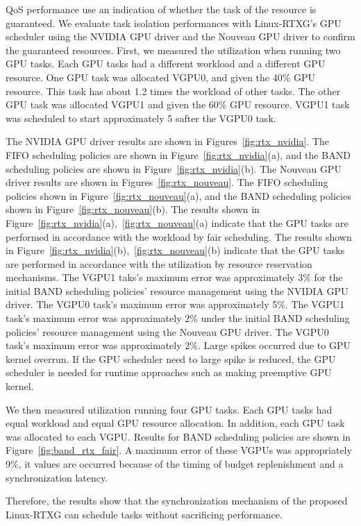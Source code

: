 QoS performance use an indication of whether the task of the resource is guaranteed.
We evaluate task isolation performances with Linux-RTXG’s GPU scheduler using the NVIDIA GPU driver and the Nouveau GPU driver to confirm the guaranteed resources.
First, we measured the utilization when running two GPU tasks.
Each GPU tasks had a different workload and a different GPU resource.
One GPU task was allocated VGPU0, and given the 40\% GPU resource.
This task has about 1.2 times the workload of other tasks.
The other GPU task was allocated VGPU1 and given the 60\% GPU resource.
VGPU1 task was scheduled to start approximately 5 safter the VGPU0 task.

The NVIDIA GPU driver results are shown in Figures~\ref{fig:rtx_nvidia}.
The FIFO scheduling policies are shown in Figure~\ref{fig:rtx_nvidia}(a),
and the BAND scheduling policies are shown in Figure~\ref{fig:rtx_nvidia}(b).
The Nouveau GPU driver results are shown in Figures~\ref{fig:rtx_nouveau}.
The FIFO scheduling policies shown in Figure~\ref{fig:rtx_nouveau}(a),
and the BAND scheduling policies shown in Figure~\ref{fig:rtx_nouveau}(b).
The results shown in Figure~\ref{fig:rtx_nvidia}(a),~\ref{fig:rtx_nouveau}(a) indicate that the GPU tasks are performed in accordance with the workload by fair scheduling.
The results shown in Figure~\ref{fig:rtx_nvidia}(b),~\ref{fig:rtx_nouveau}(b) indicate that the GPU tasks are performed in accordance with the utilization by resource reservation mechanisms.
The VGPU1 taks’s maximum error was approximately 3\% for the initial BAND scheduling policies’ resource management using the NVIDIA GPU driver.
The VGPU0 task’s maximum error was approximately 5\%.
The VGPU1 task’s maximum error was approximately 2\% under the initial BAND scheduling policies' resource management using the Nouveau GPU driver.
The VGPU0 task’s maximum error was approximately 2\%.
Large spikes occurred due to GPU kernel overrun.
If the GPU scheduler need to large spike is reduced, the GPU scheduler is needed for runtime approaches such as making preemptive GPU kernel.

We then measured utilization running four GPU tasks.
Each GPU tasks had equal workload and equal GPU resource allocation.
In addition, each GPU task was allocated to each VGPU.
Results for BAND scheduling policies are shown in Figure~\ref{fig:band_rtx_fair}.
A maximum error of these VGPUs was appropriately 9\%, it values are occurred because of the timing of budget replenishment and a synchronization latency.  

Therefore, the results show that the synchronization mechanism of the proposed Linux-RTXG can schedule tasks without sacrificing performance.

